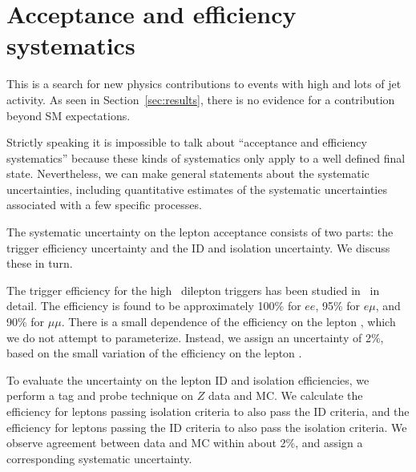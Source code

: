 \section{Acceptance and efficiency systematics}
\label{sec:systematics}

This is a search for new physics contributions to 
events with high \met and lots of jet activity.
As seen in Section~\ref{sec:results}, there is no
evidence for a contribution beyond SM expectations.

Strictly speaking it is impossible to talk about 
``acceptance and efficiency systematics'' because these kinds of
systematics only apply to a well defined final state.
Nevertheless, we can make general statements about the 
systematic uncertainties, including quantitative
estimates of the systematic uncertainties associated with
a few specific processes. 

The systematic uncertainty on the lepton acceptance consists
of two parts: the trigger efficiency uncertainty and the 
ID and isolation uncertainty.  We discuss these in turn.

The trigger efficiency for the high \pt\ dilepton triggers has been studied
in~\cite{ref:HWW} in detail. The efficiency is found to be approximately
100\% for $ee$, 95\% for $e\mu$, and 90\% for $\mu\mu$. There is a small
dependence of the efficiency on the lepton \pt, which we do not attempt
to parameterize. Instead, we assign an uncertainty of 2\%, based on the
small variation of the efficiency on the lepton \pt.

To evaluate the uncertainty on the lepton ID and isolation efficiencies,
we perform a tag and probe technique on $Z$ data and MC. We calculate
the efficiency for leptons passing isolation criteria to also pass
the ID criteria, and the efficiency for leptons passing the ID criteria
to also pass the isolation criteria.
We observe agreement between data and MC within about 2\%, and assign 
a corresponding systematic uncertainty.


